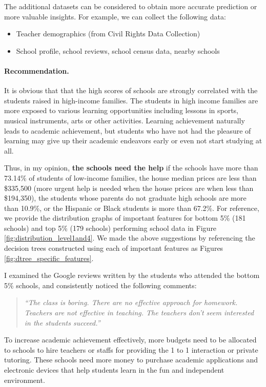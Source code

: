 \documentclass[11pt]{article}
\begin{document}
%
The additional datasets can be considered to obtain more accurate prediction or more valuable insights. For example, we can collect the following data:
\begin{itemize}
\item Teacher demographics (from Civil Rights Data Collection)
\item School profile, school reviews, school census data, nearby schools
\end{itemize}

\paragraph*{Recommendation.}

It is obvious that that the high scores of schools are strongly correlated with the students raised in high-income families.
The students in high income families are more exposed to various learning opportunities including lessons in sports, musical instruments, arts or other activities. 
%
Learning achievement naturally leads to academic achievement, but
students who have not had the pleasure of learning may give up their academic endeavors early or even not start studying at all.

Thus, in my opinion, 
\textbf{the schools need the help}
if 
the schools have more than 73.14\% of students of low-income families, 
the house median prices are less than \$335,500 (more urgent help is needed when the house prices are when less than \$194,350), 
%
the students whose parents do not graduate high schools are more than 10.9\%, or
%
the Hispanic or Black students is more than 67.2\%.
%
%
For reference, we provide the distribution graphs of important features for bottom 5\% (181 schools) and top 5\% (179 schools) performing school data in Figure \ref{fig:distribution_level1and4}. We made the above suggestions by referencing the decision trees constructed using each of important features as Figures \ref{fig:dtree_specific_features}.

I examined the Google reviews written by the students who attended the bottom 5\% schools, and consistently noticed the following  comments:
\begin{quote}
\textit{``The class is boring. There are no effective approach for homework. Teachers are not effective in teaching. The teachers don't seem interested in the students succeed.''}
\end{quote}
%
To increase academic achievement effectively, 
more budgets need to be allocated to schools to hire
teachers or staffs for providing the 1 to 1 interaction or private tutoring. 
These schools need more money to purchase academic applications and electronic devices that help students learn in the fun and independent environment.
\end{document}
